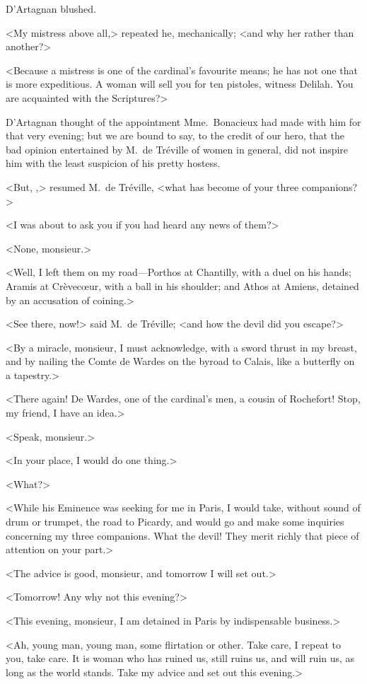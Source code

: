 D'Artagnan blushed. 

<My mistress above all,> repeated he, mechanically; <and why her rather than another?> 

<Because a mistress is one of the cardinal's favourite means; he has not one that is more expeditious. A woman will sell you for ten pistoles, witness Delilah. You are acquainted with the Scriptures?> 

D'Artagnan thought of the appointment Mme.~Bonacieux had made with him for that very evening; but we are bound to say, to the credit of our hero, that the bad opinion entertained by M.~de Tréville of women in general, did not inspire him with the least suspicion of his pretty hostess. 

<But, ,> resumed M.~de Tréville, <what has become of your three companions?> 

<I was about to ask you if you had heard any news of them?> 

<None, monsieur.> 

<Well, I left them on my road—Porthos at Chantilly, with a duel on his hands; Aramis at Crèvecœur, with a ball in his shoulder; and Athos at Amiens, detained by an accusation of coining.> 

<See there, now!> said M.~de Tréville; <and how the devil did you escape?> 

<By a miracle, monsieur, I must acknowledge, with a sword thrust in my breast, and by nailing the Comte de Wardes on the byroad to Calais, like a butterfly on a tapestry.> 

<There again! De Wardes, one of the cardinal's men, a cousin of Rochefort! Stop, my friend, I have an idea.> 

<Speak, monsieur.> 

<In your place, I would do one thing.> 

<What?> 

<While his Eminence was seeking for me in Paris, I would take, without sound of drum or trumpet, the road to Picardy, and would go and make some inquiries concerning my three companions. What the devil! They merit richly that piece of attention on your part.> 

<The advice is good, monsieur, and tomorrow I will set out.> 

<Tomorrow! Any why not this evening?> 

<This evening, monsieur, I am detained in Paris by indispensable business.> 

<Ah, young man, young man, some flirtation or other. Take care, I repeat to you, take care. It is woman who has ruined us, still ruins us, and will ruin us, as long as the world stands. Take my advice and set out this evening.> 

